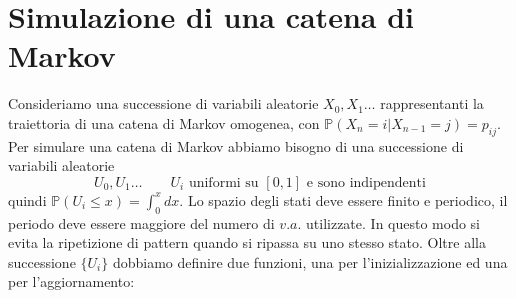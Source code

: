 \documentclass{article}
\theoremstyle{definition}
\theoremstyle{remark}
\begin{document}
\section{Simulazione di una catena di Markov}
Consideriamo una successione di variabili aleatorie $X_0,X_1\dots$ rappresentanti la traiettoria di una catena di Markov omogenea, con $\mathbb{P}(X_n = i| X_{n-1}= j) = p_{ij}$.
Per simulare una catena di Markov abbiamo bisogno di una successione di variabili aleatorie
$$U_0,U_1\dots\qquad  \text{$U_i$ uniformi su $[0,1]$ e sono indipendenti}$$
quindi $\mathbb{P}(U_i\le x) = \int_0^x dx$. Lo spazio degli stati deve essere finito e periodico,
il periodo deve essere maggiore del numero di $v.a.$ utilizzate. In questo modo si evita la ripetizione di pattern quando
si ripassa su uno stesso stato. Oltre alla successione $\{U_i\}$ dobbiamo definire due funzioni, una per l'inizializzazione
ed una per l'aggiornamento:
\end{document}
